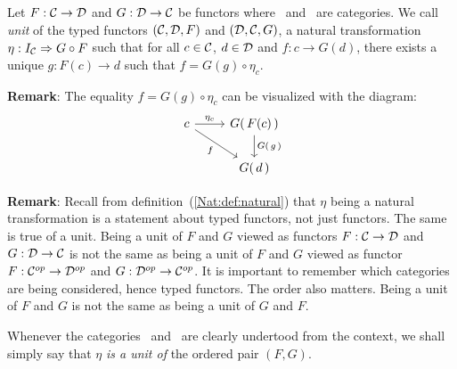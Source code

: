 \begin{defin}\label{Adj:def:unit}
    Let $F:\mbox{$\cal C$}\to\mbox{$\cal D$}$ and $G:\mbox{$\cal D$}\to\mbox{$\cal C$}$ be functors where \Cat\ and \Dat\ 
    are categories. We call {\em unit} of the typed functors $(\mbox{$\cal C$},\mbox{$\cal D$},F)$
    and $(\mbox{$\cal D$},\mbox{$\cal C$},G)$, a natural transformation 
    $\eta:I_{\cal C}\Rightarrow G\circ F$ such that for all 
    $c\in\mbox{$\cal C$}$, $d\in\mbox{$\cal D$}$ and $f:c\to G(d)$, there exists a
    unique $g:F(c) \to d$ such that $f = G(g) \circ \eta_{c}$.
\end{defin}

\noindent
{\bf Remark}: The equality $f = G(g) \circ \eta_{c}$ can be visualized with
the diagram:
    \[
        \begin{tikzcd}
            c \arrow[rd,swap, "f"]\arrow[r,"\eta_{c}"] 
            &G(\,F(c)\,)\arrow[d,"G(\,g\,)"]\\
            & G(\,d\,)
        \end{tikzcd}
    \]

\noindent
{\bf Remark}: Recall from definition~(\ref{Nat:def:natural}) that $\eta$ being
a natural transformation is a statement about typed functors, not just functors. 
The same is true of a unit. Being a unit of $F$ and $G$ viewed as functors 
$F:\mbox{$\cal C$}\to\mbox{$\cal D$}$ and $G:\mbox{$\cal D$}\to\mbox{$\cal C$}$ is not the same as being a unit of $F$ 
and $G$ viewed as functor $F:\mbox{${\cal C}^{op}$}\to\mbox{${\cal D}^{op}$}$ and $G:\mbox{${\cal D}^{op}$}\to\mbox{${\cal C}^{op}$}$. It is important
to remember which categories are being considered, hence typed functors. The
order also matters. Being a unit of $F$ and $G$ is not the same as being a unit
of $G$ and $F$.

\begin{notation}\label{Adj:notation:unit}
    Whenever the categories \Cat\ and \Dat\ are clearly undertood from the 
    context, we shall simply say that $\eta$ {\em is a unit of} the
    ordered pair $(F,G)$.
\end{notation}

